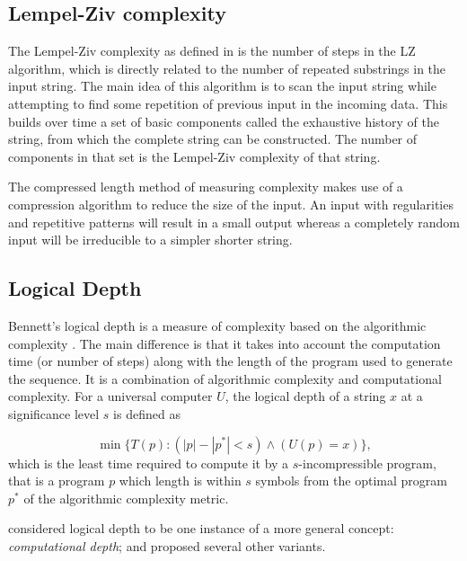 \subsection{Lempel-Ziv complexity}\label{subsection:lempel-ziv}
The Lempel-Ziv complexity as defined in
\parencite{lempelComplexityFiniteSequences1976} is the number of steps in the LZ
algorithm, which is directly related to the number of repeated substrings in the
input string. The main idea of this algorithm is to scan the input string while
attempting to find some repetition of previous input in the incoming data. This
builds over time a set of basic components called the exhaustive history of the
string, from which the complete string can be constructed. The number of
components in that set is the Lempel-Ziv complexity of that string.

The compressed length method of measuring complexity makes use of a compression
algorithm to reduce the size of the input. An input with regularities and
repetitive patterns will result in a small output whereas a completely random
input will be irreducible to a simpler shorter string.


\subsection{Logical Depth}

Bennett's logical depth is a measure of complexity based on the algorithmic
complexity \parencite{bennettDissipationInformationComputational1988,
  bennettLogicalDepthPhysical1995}. The main difference is that it takes into
account the computation time (or number of steps) along with the length of the
program used to generate the sequence. It is a combination of algorithmic
complexity and computational complexity. For a universal computer $U$, the
logical depth of a string $x$ at a significance level $s$ is defined as

\begin{equation}
  \label{eq:2}
  \min\{T(p): (|p| - |p^{*}| < s ) \wedge (U(p) = x) \},
\end{equation}
which is the least time required to compute it by a $s$-incompressible program,
that is a program $p$ which length is within $s$ symbols from the optimal program
$p^{*}$ of the algorithmic complexity metric.

\textcite{antunesComputationalDepthConcept2006} considered logical depth to be
one instance of a more general concept: \emph{computational depth}; and proposed
several other variants.

